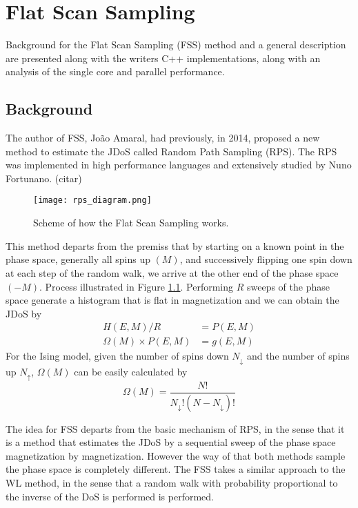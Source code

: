\chapter{Flat Scan Sampling}

	Background for the Flat Scan Sampling (FSS) method and a general description are presented along with the writers C++ implementations,  along with an analysis of the single core and parallel performance.

\section{Background}

	The author of FSS, João Amaral, had previously, in 2014, proposed a new method to estimate the JDoS called Random Path Sampling (RPS).  The RPS was implemented in high performance languages and extensively studied by Nuno Fortunano.  (citar)
	
\begin{figure}[h]
	\centering
	\texttt{[image: rps\_diagram.png]}
	\caption{Scheme of how the Flat Scan Sampling works.}
	\label{rps_dia}
\end{figure}	
	
	This method departs from the premiss that by starting on a known point in the phase space, generally all spins up $(M)$, and successively flipping one spin down at each step of the random walk, we arrive at the other end of the phase space $(-M)$. Process illustrated in Figure \ref{rps_dia}. Performing $R$ sweeps of the phase space generate a histogram that is flat in magnetization and we can obtain the JDoS by 
\begin{align}
	H(E, M)/R &= P(E, M)\\
	\Omega(M) \times P(E, M) &= g(E, M) 
\end{align}
	For the Ising model, given the number of spins down $N_{\downarrow}$ and the number of spins up $N_{\uparrow}$, $\Omega(M)$ can be easily calculated by 
\begin{equation}
	\Omega(M) = \frac{N!}{N_{\downarrow}! (N - N_{\downarrow})!}
\end{equation}

	The idea for FSS departs from the basic mechanism of RPS, in the sense that it is a method that estimates the JDoS by a sequential sweep of the phase space magnetization by magnetization. However the way of that both methods sample the phase space is completely different. The FSS takes a similar approach to the WL method, in the sense that a random walk with probability proportional to the inverse of the DoS is performed is performed. 

